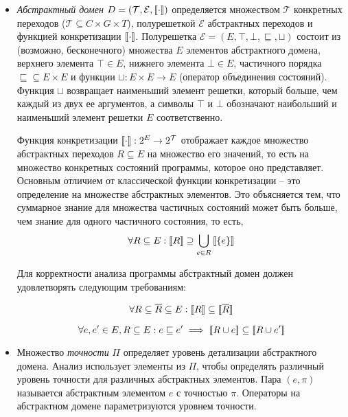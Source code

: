\begin{itemize}

\item \emph{Абстрактный домен}  $D=(\mathcal{T}, \mathcal{E},[\![ \cdot ]\!])$ определяется множеством $\mathcal{T}$ конкретных переходов ($\mathcal{T} \subseteq C \times G \times T$), полурешеткой $\mathcal{E}$ абстрактных переходов и функцией конкретизации $[\![ \cdot ]\!]$.
Полурешетка 
$\mathcal{E}=(E, \top, \bot, \sqsubseteq, \sqcup)$ состоит из (возможно, бесконечного) множества $E$ элементов абстрактного домена, верхнего элемента $\top \in E$, нижнего элемента $\bot \in E$, частичного порядка $\sqsubseteq \subseteq E \times E$ и функции $\sqcup:E \times E \rightarrow E$ (оператор объединения состояний).
Функция $\sqcup$ возвращает наименьший элемент решетки, который больше, чем каждый из двух ее аргументов, а символы $\top$ и $\bot$ обозначают наибольший и наименьший элемент решетки $E$ соответственно. 

Функция конкретизации $[\![ \cdot ]\!]: 2^E \rightarrow 2^\mathcal{T}$ отображает каждое множество абстрактных переходов $R \subseteq E$ на множество его значений, то есть на множество конкретных состояний программы, которое оно представляет.
Основным отличием от классической функции конкретизации – это определение на множестве абстрактных элементов.
Это объясняется тем, что суммарное знание для множества частичных состояний может быть больше, чем знание для одного частичного состояния, то есть,  
$$\forall R\subseteq E: [\![ R ]\!] \supseteq \bigcup_{e\in R}{[\![ \{e\} ]\!]}$$

Для корректности анализа программы абстрактный домен должен удовлетворять следующим требованиям:

\begin{equation}
\label{cpa_conc_eq_0}
\forall R \subseteq \overline{R} \subseteq E: [\![ R ]\!] \subseteq [\![ \overline R ]\!]
\end{equation}

\begin{equation}
\label{cpa_conc_eq_2}
\forall e, e' \in E, R \subseteq E : e \sqsubseteq e' \implies [\![ R \cup e ]\!] \subseteq [\![ R \cup e' ]\!]
\end{equation}

\item Множество \emph{точности} $\Pi$ определяет уровень детализации абстрактного домена. 
Анализ использует элементы из $\Pi$, чтобы определять различный уровень точности для различных абстрактных элементов.
Пара $(e, \pi)$ называется абстрактным элементом $e$ с точностью $\pi$.
Операторы на абстрактном домене параметризуются уровнем точности.


\end{itemize}
